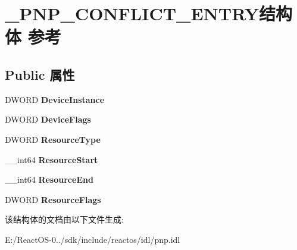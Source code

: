 \hypertarget{struct___p_n_p___c_o_n_f_l_i_c_t___e_n_t_r_y}{}\section{\+\_\+\+P\+N\+P\+\_\+\+C\+O\+N\+F\+L\+I\+C\+T\+\_\+\+E\+N\+T\+R\+Y结构体 参考}
\label{struct___p_n_p___c_o_n_f_l_i_c_t___e_n_t_r_y}
\subsection*{Public 属性}
\begin{DoxyCompactItemize}
\item 
\mbox{\label{struct___p_n_p___c_o_n_f_l_i_c_t___e_n_t_r_y_a527b4bcd53b841dc527b86cab35b65ff}} 
D\+W\+O\+RD {\bfseries Device\+Instance}
\item 
\mbox{\label{struct___p_n_p___c_o_n_f_l_i_c_t___e_n_t_r_y_a21acd7f9f0c12dd1570ed9a54a63ae9b}} 
D\+W\+O\+RD {\bfseries Device\+Flags}
\item 
\mbox{\label{struct___p_n_p___c_o_n_f_l_i_c_t___e_n_t_r_y_aec8b52a1c397a5cbf7982698a1091d52}} 
D\+W\+O\+RD {\bfseries Resource\+Type}
\item 
\mbox{\label{struct___p_n_p___c_o_n_f_l_i_c_t___e_n_t_r_y_ae552f25f3f4e60047079cce81bbfd1e1}} 
\+\_\+\+\_\+int64 {\bfseries Resource\+Start}
\item 
\mbox{\label{struct___p_n_p___c_o_n_f_l_i_c_t___e_n_t_r_y_a4760ff2afc135203b757ad31348f0b74}} 
\+\_\+\+\_\+int64 {\bfseries Resource\+End}
\item 
\mbox{\label{struct___p_n_p___c_o_n_f_l_i_c_t___e_n_t_r_y_ab1341ae0c8aad308ea5f7a8f37120fc3}} 
D\+W\+O\+RD {\bfseries Resource\+Flags}
\end{DoxyCompactItemize}


该结构体的文档由以下文件生成\+:\begin{DoxyCompactItemize}
\item 
E\+:/\+React\+O\+S-\/0../sdk/include/reactos/idl/pnp.\+idl\end{DoxyCompactItemize}

